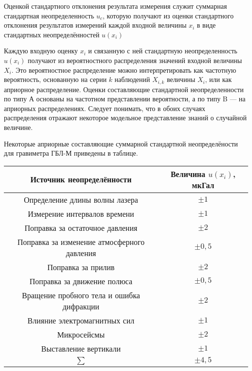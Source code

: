 \documentclass[12pt, a4paper]{article}
\theoremstyle{remark}
\begin{document}
\begin{enumerate}
    Оценкой стандартного отклонения результата измерения служит суммарная стандартная
    неопределенность $u_c$, которую получают из оценки стандартного отклонения результатов измерений
    каждой входной величины $x_i$ в виде стандартных неопределённостей $u(x_i)$

    Каждую входную оценку $x_i$ и связанную с ней стандартную неопределенность $u(x_i)$ получают 
    из вероятностного распределения значений входной величины $X_i$. Это вероятностное
    распределение можно интерпретировать как частотную вероятность, основанную на серии $k$
    наблюдений $X_{i,k}$ величины $X_i$, или как априорное распределение. Оценки составляющие
    стандартной неопределенности по типу А основаны на частотном представлении вероятности, а по
    типу B --- на априорных распределениях. Следует понимать, что в обоих случаях распределения
    отражают некоторое модельное представление знаний о случайной величине.
    
    Некоторые априорные составляющие суммарной стандартной неопределёности для гравиметра ГБЛ-М
    приведены в таблице.
    \begin{table}[h]
        \centering
        \begin{tabular}{|c|c|}
            \hline
            Источник неопределённости & Величина $u (x_i)$, мкГал \\\hline
            Определение длины волны лазера & $\pm 1$ \\
            Измерение интервалов времени & $\pm 1$ \\\hline
            Поправка за остаточное давления  & $\pm 2$ \\
            Поправка за изменение атмосферного давления & $\pm 0,5$\\
            Поправка за прилив & $\pm 2$\\  
            Поправка за движение полюса & $\pm 0,5$\\\hline  
            Вращение пробного тела и ошибка дифракции & $\pm 2$\\  
            Влияние электромагнитных сил & $\pm 1$\\  
            Микросейсмы & $\pm 2$\\  
            Выставление вертикали & $\pm 1$\\\hline
            $\sum$ & $\pm 4,5$ \\\hline
        \end{tabular}
    \end{table}


\end{enumerate}
\end{document}
